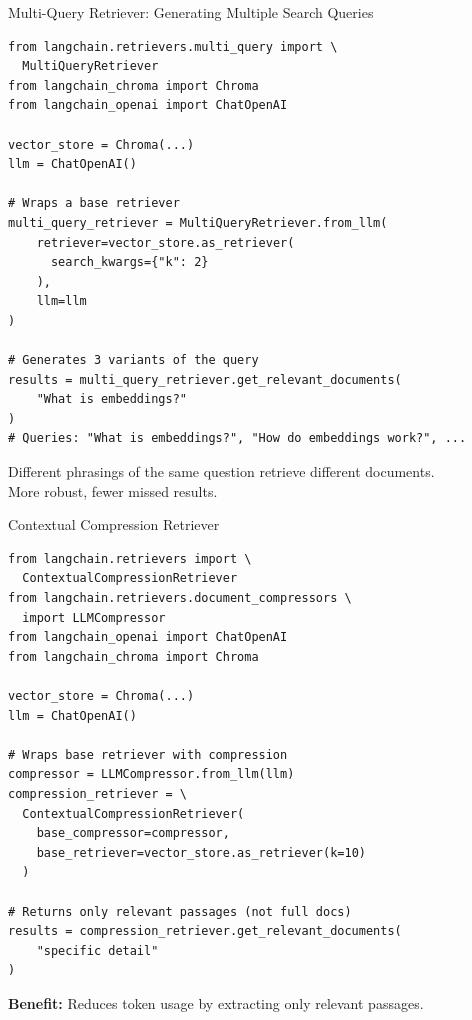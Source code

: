 \documentclass[aspectratio=169,11pt]{beamer}
\begin{document}
\begin{frame}[fragile]{Multi-Query Retriever: Generating Multiple Search Queries}
  \begin{lstlisting}
from langchain.retrievers.multi_query import \
  MultiQueryRetriever
from langchain_chroma import Chroma
from langchain_openai import ChatOpenAI

vector_store = Chroma(...)
llm = ChatOpenAI()

# Wraps a base retriever
multi_query_retriever = MultiQueryRetriever.from_llm(
    retriever=vector_store.as_retriever(
      search_kwargs={"k": 2}
    ),
    llm=llm
)

# Generates 3 variants of the query
results = multi_query_retriever.get_relevant_documents(
    "What is embeddings?"
)
# Queries: "What is embeddings?", "How do embeddings work?", ...
  \end{lstlisting}

  \vspace{0.07cm}
  \begin{conceptbox}
    Different phrasings of the same question retrieve different documents.\\
    More robust, fewer missed results.
  \end{conceptbox}
\end{frame}

\begin{frame}[fragile]{Contextual Compression Retriever}
  \begin{lstlisting}
from langchain.retrievers import \
  ContextualCompressionRetriever
from langchain.retrievers.document_compressors \
  import LLMCompressor
from langchain_openai import ChatOpenAI
from langchain_chroma import Chroma

vector_store = Chroma(...)
llm = ChatOpenAI()

# Wraps base retriever with compression
compressor = LLMCompressor.from_llm(llm)
compression_retriever = \
  ContextualCompressionRetriever(
    base_compressor=compressor,
    base_retriever=vector_store.as_retriever(k=10)
  )

# Returns only relevant passages (not full docs)
results = compression_retriever.get_relevant_documents(
    "specific detail"
)
  \end{lstlisting}

  \vspace{0.07cm}
  \textbf{Benefit:} Reduces token usage by extracting only relevant passages.
\end{frame}
\end{document}
